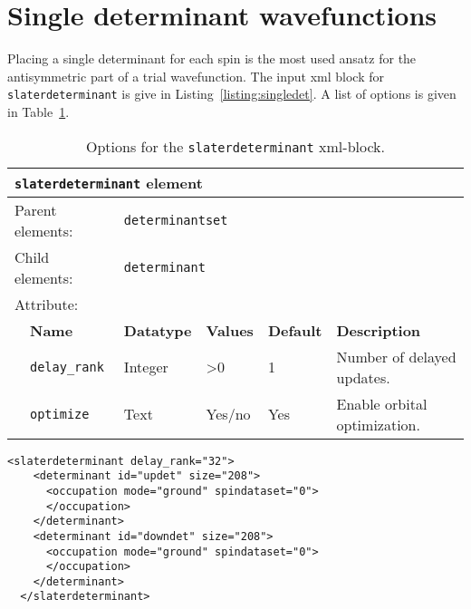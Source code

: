 \section{Single determinant wavefunctions}
\label{sec:singledeterminant}
Placing a single determinant for each spin is the most used ansatz for the antisymmetric part of a trial wavefunction.
The input xml block for \texttt{slaterdeterminant} is give in Listing~\ref{listing:singledet}. A list of options is given in
Table~\ref{table:singledet}.

\begin{table}[h]
\begin{center}
\begin{tabularx}{\textwidth}{l l l l l X }
\hline
\multicolumn{6}{l}{\texttt{slaterdeterminant} element} \\
\hline
\multicolumn{2}{l}{Parent elements:} & \multicolumn{4}{l}{\texttt{determinantset}}\\
\multicolumn{2}{l}{Child  elements:} & \multicolumn{4}{l}{\texttt{determinant}}\\
\multicolumn{2}{l}{Attribute:} & \multicolumn{4}{l}{}\\
   &   \bfseries Name       & \bfseries Datatype & \bfseries Values & \bfseries Default & \bfseries Description \\
   &   \texttt{delay\_rank} &  Integer           &  >0              & 1           &  Number of delayed updates. \\
   &   \texttt{optimize}    &  Text              &  Yes/no          & Yes         &  Enable orbital optimization. \\
  \hline
\end{tabularx}
\end{center}
\caption{Options for the \texttt{slaterdeterminant} xml-block.}
\label{table:singledet}
\end{table}

\begin{lstlisting}[style=QMCPXML,caption=Slaterdeterminant set XML element.\label{listing:singledet}]
  <slaterdeterminant delay_rank="32">
    <determinant id="updet" size="208">
      <occupation mode="ground" spindataset="0">
      </occupation>
    </determinant>
    <determinant id="downdet" size="208">
      <occupation mode="ground" spindataset="0">
      </occupation>
    </determinant>
  </slaterdeterminant>
\end{lstlisting}

